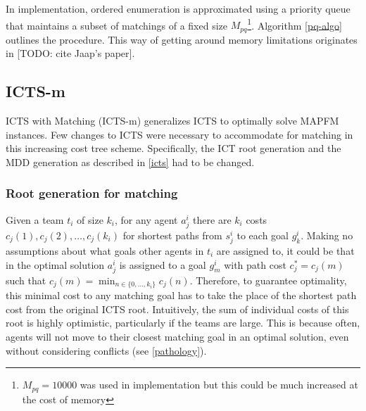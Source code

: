 \documentclass[english,10pt]{article}
\begin{document}
	In implementation, ordered enumeration is approximated using a priority queue that maintains a subset of matchings of a fixed size $M_{pq}$\footnote{$M_{pq} = 10000$ was used in implementation but this could be much increased at the cost of memory}. Algorithm \ref{pq-algo} outlines the procedure. This way of getting around memory limitations originates in [TODO: cite Jaap's paper].
	
	\subsection{ICTS-m}
	ICTS with Matching (ICTS-m) generalizes ICTS to optimally solve MAPFM instances. Few changes to ICTS were necessary to accommodate for matching in this increasing cost tree scheme. Specifically, the ICT root generation and the MDD generation as described in \ref{icts} had to be changed.
	\subsubsection{Root generation for matching}
	Given a team $t_i$ of size $k_i$, for any agent $a_j^i$ there are $k_i$ costs $c_j(1),c_j(2),\ldots,c_j(k_i)$ for shortest paths from $s_j^i$ to each goal $g_k^i$. Making no assumptions about what goals other agents in $t_i$ are assigned to, it could be that in the optimal solution $a_j^i$ is assigned to a goal $g_{m}^i$ with path cost $c^*_j = c_j(m)$ such that $c_j(m) = \min_{n\in\{0,\ldots,k_i\}} c_j(n)$. Therefore, to guarantee optimality, this minimal cost to any matching goal has to take the place of the shortest path cost from the original ICTS root. Intuitively, the sum of individual costs of this root is highly optimistic, particularly if the teams are large. This is because often, agents will not move to their closest matching goal in an optimal solution, even without considering conflicts (see \ref{pathology}).
	
\end{document}
